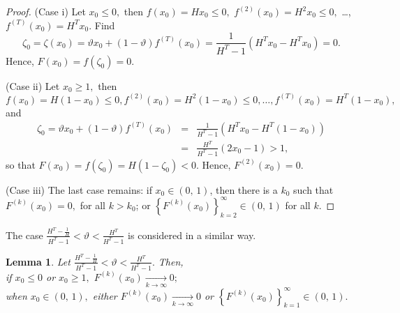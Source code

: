 \documentclass[12pt,a4paper]{amsart}
\newtheorem{lemma}{Lemma}
\begin{document}
\begin{proof}
(Case i) Let $x_0\leq 0,$ then $f(x_0)=Hx_0\leq 0,$ $f^{(2)}(x_0)=H^2 x_0\leq 0,$ \ldots, $f^{(T)}(x_0)=H^T x_0.$  Find 
$$
\zeta_0 = \zeta(x_0) =\vartheta x_0 + (1-\vartheta)f^{(T)}(x_0)=\frac{1}{H^T-1}\left(H^T x_0 - H^T x_0\right)=0.
$$ 
Hence, $F(x_0)=f(\zeta_0)=0.$

\noindent
(Case ii) Let $x_0\geq 1,$ then 
$$f(x_0)=H (1-x_0)\leq 0,f^{(2)}(x_0)=H^2 (1-x_0)\leq 0, \dots, f^{(T)}(x_0)=H^T (1-x_0),$$
and
\begin{eqnarray*}
\zeta_0 =\vartheta x_0 + (1-\vartheta)f^{(T)}(x_0)&=&\frac{1}{H^T-1}\left(H^T x_0 - H^T (1-x_0)\right)\\
&=&\frac{H^T}{H^T-1}(2x_0-1)>1,
\end{eqnarray*}
so that
$F(x_0)=f(\zeta_0)=H(1-\zeta_0)<0.$ Hence, $F^{(2)}(x_0)=0.$ 

\noindent
(Case iii) The last case remains: if $x_0\in(0,\,1)$, then there is a $k_0$ such that  $F^{(k)}(x_0)=0,$ for all $k>k_0$;   or 
$\left\{F^{(k)}(x_0)\right\}_{k=2}^{\infty}\in(0,\,1)$ for all $k$.
\end{proof}

The case $\frac{H^T-\frac{1}{H}}{H^T-1}<\vartheta<\frac{H^T}{H^T-1}$ is considered in a similar way.

\begin{lemma}\label{l3}
Let $\frac{H^T-\frac{1}{H}}{H^T-1}<\vartheta<\frac{H^T}{H^T-1}.$ Then, \\ if $x_0\leq 0$ or $x_0\geq 1,$ 
${F^{(k)}(x_0)\xrightarrow[k\rightarrow\infty]{}0;}$\\ when $x_0\in(0,\,1),$ either $F^{(k)}(x_0)\xrightarrow[k\rightarrow\infty]{}0$
or $\left\{F^{(k)}(x_0)\right\}_{k=1}^{\infty}\in(0,\,1).$
\end{lemma}
\end{document}
